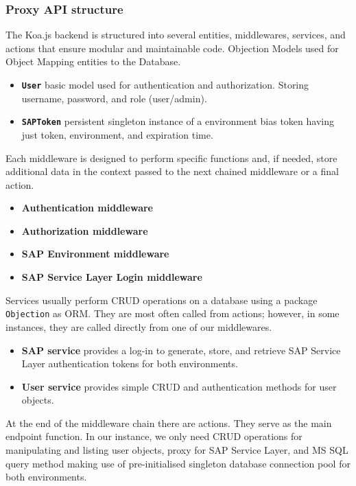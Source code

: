 \subsubsection{Proxy API structure}
The Koa.js backend is structured into several entities, middlewares, services, and actions that ensure modular and maintainable code. 
Objection Models used for Object Mapping entities to the Database.
\begin{itemize}
    \item \textbf{\texttt{User}} basic model used for authentication and authorization. Storing username, password, and role (user/admin).
    \item \textbf{\texttt{SAPToken}} persistent singleton instance of a environment bias token having just token, environment, and expiration time.
\end{itemize}
Each middleware is designed to perform specific functions and, if needed, store additional data in the context passed to the next chained middleware or a final action.
\begin{itemize}
    \item \textbf{Authentication middleware}
    \item \textbf{Authorization middleware}
    \item \textbf{SAP Environment middleware}
    \item \textbf{SAP Service Layer Login middleware}
\end{itemize}
Services usually perform \ac{CRUD} operations on a database using a package \texttt{Objection} as \ac{ORM}. They are most often called from actions; however, in some instances, they are called directly from one of our middlewares.
\begin{itemize}
    \item \textbf{SAP service} provides a log-in to generate, store, and retrieve SAP Service Layer authentication tokens for both environments.
    \item \textbf{User service} provides simple CRUD and authentication methods for user objects.
\end{itemize}
At the end of the middleware chain there are actions.
They serve as the main endpoint function.
In our instance, we only need CRUD operations for manipulating and listing user objects, proxy for SAP Service Layer, and \ac{MS} SQL query method making use of pre-initialised singleton database connection pool for both environments.
